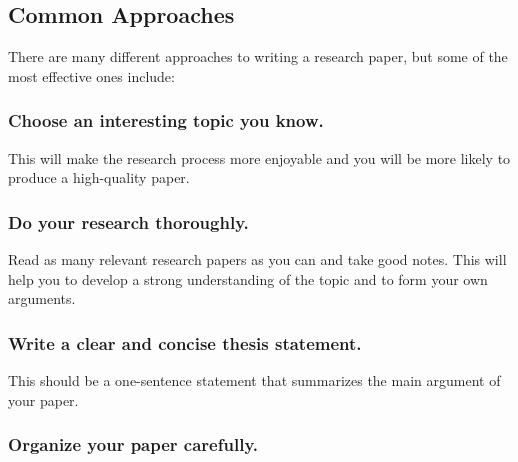 \documentclass[
  b5paper]{book}
\begin{document}
\hypertarget{common-approaches-1}{%
\subsection*{Common Approaches}\label{common-approaches-1}}

There are many different approaches to writing a research paper, but some of the most effective ones include:

\hypertarget{choose-an-interesting-topic-you-know.}{%
\subsubsection*{Choose an interesting topic you know.}\label{choose-an-interesting-topic-you-know.}}

This will make the research process more enjoyable and you will be more likely to produce a high-quality paper.

\hypertarget{do-your-research-thoroughly.}{%
\subsubsection*{Do your research thoroughly.}\label{do-your-research-thoroughly.}}

Read as many relevant research papers as you can and take good notes. This will help you to develop a strong understanding of the topic and to form your own arguments.

\hypertarget{write-a-clear-and-concise-thesis-statement.}{%
\subsubsection*{Write a clear and concise thesis statement.}\label{write-a-clear-and-concise-thesis-statement.}}

This should be a one-sentence statement that summarizes the main argument of your paper.

\hypertarget{organize-your-paper-carefully.}{%
\subsubsection*{Organize your paper carefully.}\label{organize-your-paper-carefully.}}
\end{document}
